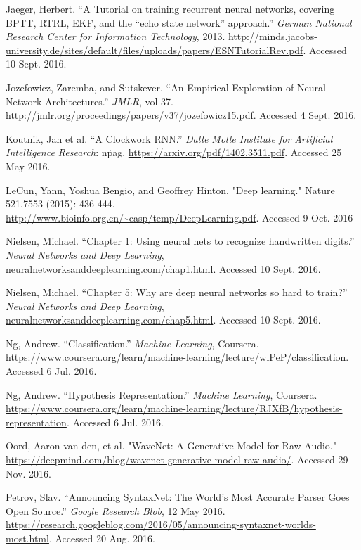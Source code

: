\documentclass[12pt, titlepage]{article}
\begin{document}
\begin{thebibliography}{9}
		Jaeger, Herbert. ``A Tutorial on training recurrent neural networks,
		covering BPTT, RTRL, EKF, and the ``echo state network'' approach.''
		\textit{German National Research Center for Information Technology},
		2013.
		\url{http://minds.jacobs-university.de/sites/default/files/uploads/papers/ESNTutorialRev.pdf}.
		Accessed 10 Sept. 2016.

		Jozefowicz, Zaremba, and Sutskever. ``An Empirical Exploration of Neural
		Network Architectures.'' \textit{JMLR}, vol 37.
		\url{http://jmlr.org/proceedings/papers/v37/jozefowicz15.pdf}. Accessed
		4 Sept. 2016.

		Koutnik, Jan et al. ``A Clockwork RNN.'' \textit{Dalle Molle Institute
		for Artificial Intelligence Research}: n\. pag.
		\url{https://arxiv.org/pdf/1402.3511.pdf}. Accessed 25 May 2016.

		LeCun, Yann, Yoshua Bengio, and Geoffrey Hinton. "Deep learning." Nature
		521.7553 (2015): 436-444.
		\url{http://www.bioinfo.org.cn/~casp/temp/DeepLearning.pdf}. Accessed 9 Oct. 2016

		Nielsen, Michael. ``Chapter 1: Using neural nets to recognize
		handwritten digits.'' \textit{Neural Networks and Deep Learning},
		\url{neuralnetworksanddeeplearning.com/chap1.html}. Accessed 10 Sept. 2016.

		Nielsen, Michael. ``Chapter 5: Why are deep neural networks so hard to
		train?'' \textit{Neural Networks and Deep Learning},
		\url{neuralnetworksanddeeplearning.com/chap5.html}. Accessed 10 Sept. 2016.

		Ng, Andrew. ``Classification.'' \textit{Machine Learning}, Coursera.
		\url{https://www.coursera.org/learn/machine-learning/lecture/wlPeP/classification}.
		Accessed 6 Jul. 2016.

		Ng, Andrew. ``Hypothesis Representation.'' \textit{Machine Learning}, Coursera.
		\url{https://www.coursera.org/learn/machine-learning/lecture/RJXfB/hypothesis-representation}.
		Accessed 6 Jul. 2016.

		Oord, Aaron van den, et al. "WaveNet: A Generative Model for Raw Audio."
		\url{https://deepmind.com/blog/wavenet-generative-model-raw-audio/}.
		Accessed 29 Nov. 2016.

		Petrov, Slav. ``Announcing SyntaxNet: The World's Most Accurate Parser
		Goes Open Source.'' \textit{Google Research Blob}, 12 May 2016.
		\url{https://research.googleblog.com/2016/05/announcing-syntaxnet-worlds-most.html}.
		Accessed 20 Aug. 2016.


\end{thebibliography}
\end{document}
